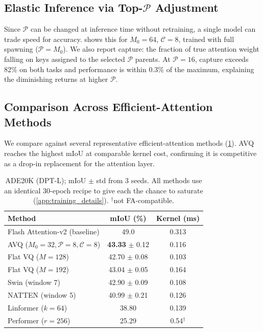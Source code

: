 \subsection{Elastic Inference via Top-$\mathcal{P}$ Adjustment}
Since $\mathcal{P}$ can be changed at inference time without retraining, a single model can trade speed for accuracy.  shows this for $M_0{=}64$, $\mathcal{C}{=}8$, trained with full spawning ($\mathcal{P}{=}M_0$). We also report capture: the fraction of true attention weight falling on keys assigned to the selected $\mathcal{P}$ parents. At $\mathcal{P}{=}16$, capture exceeds 82\% on both tasks and performance is within 0.3\% of the maximum, explaining the diminishing returns at higher $\mathcal{P}$.

\subsection{Comparison Across Efficient-Attention Methods}
\label{sec:exp_baselines}
We compare against several representative efficient-attention methods (\cref{tab:ade20k_baselines}). AVQ reaches the highest mIoU at comparable kernel cost, confirming it is competitive as a drop-in replacement for the attention layer. 

\begin{table}[h!]
\centering
\setlength{\tabcolsep}{6pt}
\caption{ADE20K (DPT-L); mIoU $\pm$ std from 3 seeds. All methods use an identical 30-epoch recipe to give each the chance to saturate (\cref{app:training_details}). $^\dagger$not FA-compatible.}
\label{tab:ade20k_baselines}
\begin{tabular}{lcc}
\toprule
\textbf{Method} & \textbf{mIoU (\%)} & \textbf{Kernel (ms)} \\
\midrule
Flash Attention-v2 (baseline)              & 49.0  & 0.313 \\
\midrule
AVQ ($M_0{=}32, \mathcal{P}{=}8, \mathcal{C}{=}8$) & \textbf{43.33} $\pm$ 0.12 & 0.116 \\
Flat VQ ($M{=}128$)             & 42.70 $\pm$ 0.08 & 0.103 \\
Flat VQ ($M{=}192$)             & 43.04 $\pm$ 0.05 & 0.164 \\
Swin (window 7)~\cite{liu2021swin}      & 42.90 $\pm$ 0.09 & 0.108 \\
NATTEN (window 5)~\cite{hassani2023nat} & 40.99 $\pm$ 0.21 & 0.126 \\
Linformer ($k{=}64$)~\cite{wang2020linformer} & 38.80 & 0.139 \\
Performer ($r{=}256$)~\cite{choromanski2021performer} & 25.29 & 0.54$^\dagger$ \\
\bottomrule
\end{tabular}
\end{table}

